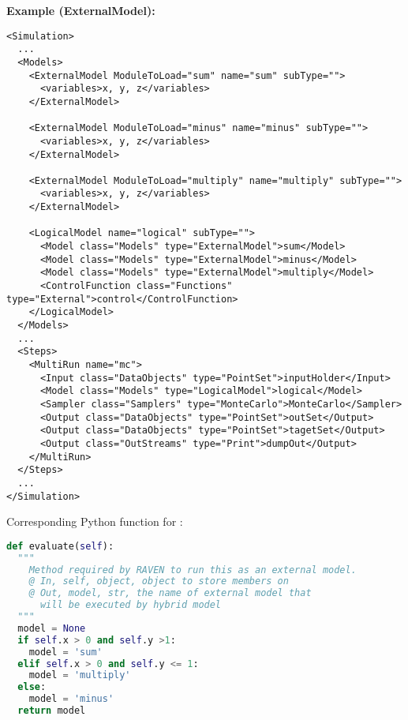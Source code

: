 \textbf{Example (ExternalModel):}
\begin{lstlisting}[style=XML,morekeywords={subType,debug,name,class,type}]
<Simulation>
  ...
  <Models>
    <ExternalModel ModuleToLoad="sum" name="sum" subType="">
      <variables>x, y, z</variables>
    </ExternalModel>

    <ExternalModel ModuleToLoad="minus" name="minus" subType="">
      <variables>x, y, z</variables>
    </ExternalModel>

    <ExternalModel ModuleToLoad="multiply" name="multiply" subType="">
      <variables>x, y, z</variables>
    </ExternalModel>

    <LogicalModel name="logical" subType="">
      <Model class="Models" type="ExternalModel">sum</Model>
      <Model class="Models" type="ExternalModel">minus</Model>
      <Model class="Models" type="ExternalModel">multiply</Model>
      <ControlFunction class="Functions" type="External">control</ControlFunction>
    </LogicalModel>
  </Models>
  ...
  <Steps>
    <MultiRun name="mc">
      <Input class="DataObjects" type="PointSet">inputHolder</Input>
      <Model class="Models" type="LogicalModel">logical</Model>
      <Sampler class="Samplers" type="MonteCarlo">MonteCarlo</Sampler>
      <Output class="DataObjects" type="PointSet">outSet</Output>
      <Output class="DataObjects" type="PointSet">tagetSet</Output>
      <Output class="OutStreams" type="Print">dumpOut</Output>
    </MultiRun>
  </Steps>
  ...
</Simulation>

\end{lstlisting}

Corresponding Python function for :
\begin{lstlisting}[language=python]
def evaluate(self):
  """
    Method required by RAVEN to run this as an external model.
    @ In, self, object, object to store members on
    @ Out, model, str, the name of external model that
      will be executed by hybrid model
  """
  model = None
  if self.x > 0 and self.y >1:
    model = 'sum'
  elif self.x > 0 and self.y <= 1:
    model = 'multiply'
  else:
    model = 'minus'
  return model
\end{lstlisting}

